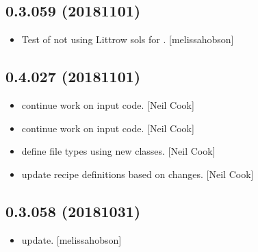 \documentclass[a4paper,10pt,english]{report}
\begin{document}
\subsection{0.3.059 (2018\sphinxhyphen{}11\sphinxhyphen{}01)}
\label{\detokenize{misc/changelog:id291}}\begin{itemize}
\item {} 
Test of not using Littrow sols for . {[}melissa\sphinxhyphen{}hobson{]}

\end{itemize}


\subsection{0.4.027 (2018\sphinxhyphen{}11\sphinxhyphen{}01)}
\label{\detokenize{misc/changelog:id292}}\begin{itemize}
\item {} 
 \sphinxhyphen{} continue work on input code. {[}Neil Cook{]}

\item {} 
 \sphinxhyphen{} continue work on input code. {[}Neil Cook{]}

\item {} 
 \sphinxhyphen{} define file types using new classes. {[}Neil Cook{]}

\item {} 
 \sphinxhyphen{} update recipe definitions based on changes. {[}Neil Cook{]}

\end{itemize}


\subsection{0.3.058 (2018\sphinxhyphen{}10\sphinxhyphen{}31)}
\label{\detokenize{misc/changelog:id293}}\begin{itemize}
\item {} 
 update. {[}melissa\sphinxhyphen{}hobson{]}

\end{itemize}
\end{document}
